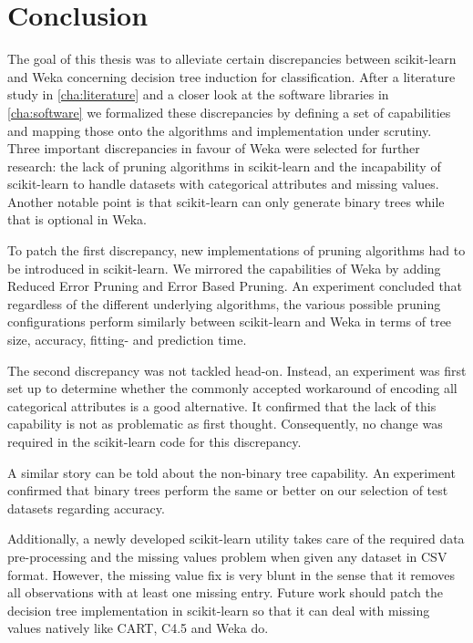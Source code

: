 \chapter{Conclusion}\label{cha:conclusion}
The goal of this thesis was to alleviate certain discrepancies between scikit-learn and Weka concerning decision tree induction for classification. After a literature study in \autoref{cha:literature} and a closer look at the software libraries in \autoref{cha:software} we formalized these discrepancies by defining a set of capabilities and mapping those onto the algorithms and implementation under scrutiny. Three important discrepancies in favour of Weka were selected for further research: the lack of pruning algorithms in scikit-learn and the incapability of scikit-learn to handle datasets with categorical attributes and missing values. Another notable point is that scikit-learn can only generate binary trees while that is optional in Weka.

To patch the first discrepancy, new implementations of pruning algorithms had to be introduced in scikit-learn. We mirrored the capabilities of Weka by adding Reduced Error Pruning and Error Based Pruning. An experiment concluded that regardless of the different underlying algorithms, the various possible pruning configurations perform similarly between scikit-learn and Weka in terms of tree size, accuracy, fitting- and prediction time.

The second discrepancy was not tackled head-on. Instead, an experiment was first set up to determine whether the commonly accepted workaround of encoding all categorical attributes is a good alternative. It confirmed that the lack of this capability is not as problematic as first thought. Consequently, no change was required in the scikit-learn code for this discrepancy.

A similar story can be told about the non-binary tree capability. An experiment confirmed that binary trees perform the same or better on our selection of test datasets regarding accuracy.

Additionally, a newly developed scikit-learn utility takes care of the required data pre-processing and the missing values problem when given any dataset in CSV format. However, the missing value fix is very blunt in the sense that it removes all observations with at least one missing entry. Future work should patch the decision tree implementation in scikit-learn so that it can deal with missing values natively like CART, C4.5 and Weka do.

